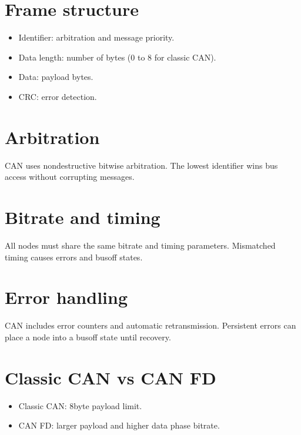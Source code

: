 \documentclass[letterpaper,10pt,english]{sphinxmanual}
\begin{document}
\section{Frame structure}
\label{\detokenize{appendix_q_can_bus:frame-structure}}\begin{itemize}
\item {} 
\sphinxAtStartPar
Identifier: arbitration and message priority.

\item {} 
\sphinxAtStartPar
Data length: number of bytes (0 to 8 for classic CAN).

\item {} 
\sphinxAtStartPar
Data: payload bytes.

\item {} 
\sphinxAtStartPar
CRC: error detection.

\end{itemize}


\section{Arbitration}
\label{\detokenize{appendix_q_can_bus:arbitration}}
\sphinxAtStartPar
CAN uses non\sphinxhyphen{}destructive bitwise arbitration. The lowest identifier wins bus
access without corrupting messages.


\section{Bitrate and timing}
\label{\detokenize{appendix_q_can_bus:bitrate-and-timing}}
\sphinxAtStartPar
All nodes must share the same bitrate and timing parameters. Mismatched timing
causes errors and bus\sphinxhyphen{}off states.


\section{Error handling}
\label{\detokenize{appendix_q_can_bus:error-handling}}
\sphinxAtStartPar
CAN includes error counters and automatic retransmission. Persistent errors
can place a node into a bus\sphinxhyphen{}off state until recovery.


\section{Classic CAN vs CAN FD}
\label{\detokenize{appendix_q_can_bus:classic-can-vs-can-fd}}\begin{itemize}
\item {} 
\sphinxAtStartPar
Classic CAN: 8\sphinxhyphen{}byte payload limit.

\item {} 
\sphinxAtStartPar
CAN FD: larger payload and higher data phase bitrate.

\end{itemize}
\end{document}

